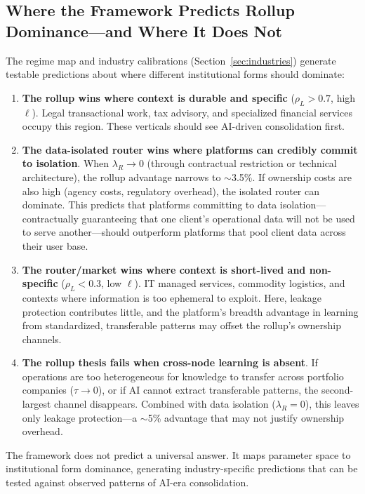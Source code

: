 \documentclass[12pt]{article}
\theoremstyle{definition}
\begin{document}
\subsection{Where the Framework Predicts Rollup Dominance---and Where It Does Not}

The regime map and industry calibrations (Section~\ref{sec:industries}) generate testable predictions about where different institutional forms should dominate:

\begin{enumerate}[leftmargin=*]
\item \textbf{The rollup wins where context is durable and specific} ($\rho_L > 0.7$, high $\ell$). Legal transactional work, tax advisory, and specialized financial services occupy this region. These verticals should see AI-driven consolidation first.

\item \textbf{The data-isolated router wins where platforms can credibly commit to isolation}. When $\lambda_R \to 0$ (through contractual restriction or technical architecture), the rollup advantage narrows to $\sim$3.5\%. If ownership costs are also high (agency costs, regulatory overhead), the isolated router can dominate. This predicts that platforms committing to data isolation---contractually guaranteeing that one client's operational data will not be used to serve another---should outperform platforms that pool client data across their user base.

\item \textbf{The router/market wins where context is short-lived and non-specific} ($\rho_L < 0.3$, low $\ell$). IT managed services, commodity logistics, and contexts where information is too ephemeral to exploit. Here, leakage protection contributes little, and the platform's breadth advantage in learning from standardized, transferable patterns may offset the rollup's ownership channels.

\item \textbf{The rollup thesis fails when cross-node learning is absent}. If operations are too heterogeneous for knowledge to transfer across portfolio companies ($\tau \to 0$), or if AI cannot extract transferable patterns, the second-largest channel disappears. Combined with data isolation ($\lambda_R = 0$), this leaves only leakage protection---a $\sim$5\% advantage that may not justify ownership overhead.
\end{enumerate}

\noindent The framework does not predict a universal answer. It maps parameter space to institutional form dominance, generating industry-specific predictions that can be tested against observed patterns of AI-era consolidation.
\end{document}
